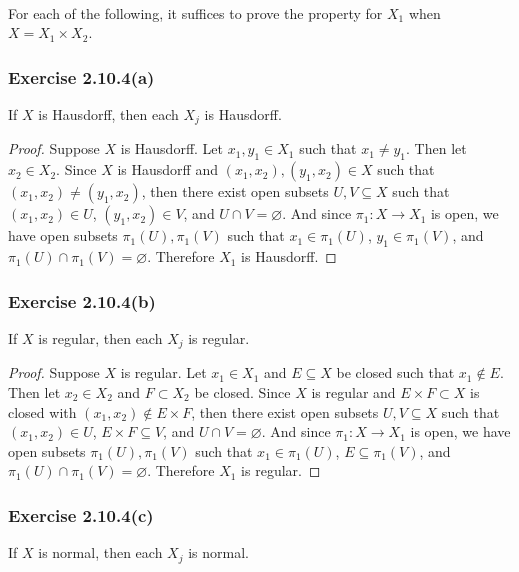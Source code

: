 \documentclass[12pt]{article}
\newenvironment{problem}
    {\begin{lrbox}{\mybox}\begin{minipage}{\textwidth-10pt}}
    {\end{minipage}\end{lrbox}\framebox[6.5in]{\usebox{\mybox}}}
\newenvironment{response}{\paragraph{}}{}
\let\emptyset\varnothing
\begin{document}
\begin{response}
    For each of the following, it suffices to prove the property for $X_1$ when $X=X_1\times X_2$.
\end{response}

\subsubsection*{Exercise 2.10.4(a)}
\begin{problem}
    If $X$ is Hausdorff, then each $X_j$ is Hausdorff.
\end{problem}

\begin{proof}
    Suppose $X$ is Hausdorff. Let $x_1,y_1\in X_1$ such that $x_1\ne y_1$. Then let $x_2\in X_2$. Since $X$ is Hausdorff and $(x_1,x_2),(y_1,x_2)\in X$ such that $(x_1,x_2)\ne(y_1,x_2)$, then there exist open subsets $U,V\subseteq X$ such that $(x_1,x_2)\in U$, $(y_1,x_2)\in V$, and $U\cap V = \emptyset$. And since $\pi_1:X\to X_1$ is open, we have open subsets $\pi_1(U),\pi_1(V)$ such that $x_1\in\pi_1(U)$, $y_1\in\pi_1(V)$, and $\pi_1(U)\cap\pi_1(V) = \emptyset$. Therefore $X_1$ is Hausdorff.
    
\end{proof}

\subsubsection*{Exercise 2.10.4(b)}
\begin{problem}
    If $X$ is regular, then each $X_j$ is regular.
\end{problem}

\begin{proof}
    Suppose $X$ is regular. Let $x_1\in X_1$ and $E\subseteq X$ be closed such that $x_1\notin E$. Then let $x_2\in X_2$ and $F\subset X_2$ be closed. Since $X$ is regular and $E\times F\subset X$ is closed with $(x_1,x_2)\notin E\times F$, then there exist open subsets $U,V\subseteq X$ such that $(x_1,x_2)\in U$, $E\times F\subseteq V$, and $U\cap V = \emptyset$. And since $\pi_1:X\to X_1$ is open, we have open subsets $\pi_1(U),\pi_1(V)$ such that $x_1\in\pi_1(U)$, $E\subseteq\pi_1(V)$, and $\pi_1(U)\cap\pi_1(V) = \emptyset$. Therefore $X_1$ is regular.
    
\end{proof}

\subsubsection*{Exercise 2.10.4(c)}
\begin{problem}
    If $X$ is normal, then each $X_j$ is normal.
\end{problem}
\end{document}
